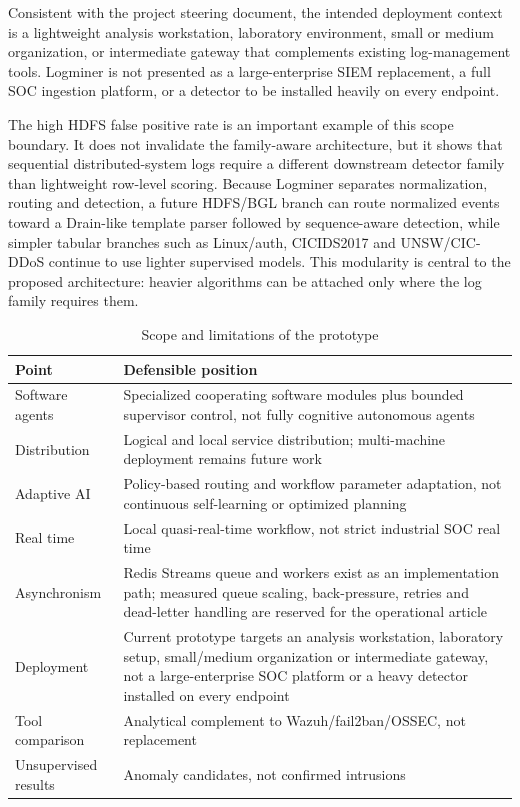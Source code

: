 \documentclass[conference]{IEEEtran}
\newcommand{\logminer}{Logminer}
\begin{document}
Consistent with the project steering document, the intended deployment context is a lightweight analysis workstation, laboratory environment, small or medium organization, or intermediate gateway that complements existing log-management tools. \logminer{} is not presented as a large-enterprise SIEM replacement, a full SOC ingestion platform, or a detector to be installed heavily on every endpoint.

The high HDFS false positive rate is an important example of this scope boundary. It does not invalidate the family-aware architecture, but it shows that sequential distributed-system logs require a different downstream detector family than lightweight row-level scoring. Because \logminer{} separates normalization, routing and detection, a future HDFS/BGL branch can route normalized events toward a Drain-like template parser followed by sequence-aware detection, while simpler tabular branches such as Linux/auth, CICIDS2017 and UNSW/CIC-DDoS continue to use lighter supervised models. This modularity is central to the proposed architecture: heavier algorithms can be attached only where the log family requires them.

\begin{table}[t]
\caption{Scope and limitations of the prototype}
\label{tab:limits}
\centering
\scriptsize
\begin{tabularx}{\linewidth}{p{2.1cm}X}
\toprule
\textbf{Point} & \textbf{Defensible position} \\
\midrule
Software agents & Specialized cooperating software modules plus bounded supervisor control, not fully cognitive autonomous agents \\
Distribution & Logical and local service distribution; multi-machine deployment remains future work \\
Adaptive AI & Policy-based routing and workflow parameter adaptation, not continuous self-learning or optimized planning \\
Real time & Local quasi-real-time workflow, not strict industrial SOC real time \\
Asynchronism & Redis Streams queue and workers exist as an implementation path; measured queue scaling, back-pressure, retries and dead-letter handling are reserved for the operational article \\
Deployment & Current prototype targets an analysis workstation, laboratory setup, small/medium organization or intermediate gateway, not a large-enterprise SOC platform or a heavy detector installed on every endpoint \\
Tool comparison & Analytical complement to Wazuh/fail2ban/OSSEC, not replacement \\
Unsupervised results & Anomaly candidates, not confirmed intrusions \\
\bottomrule
\end{tabularx}
\end{table}
\end{document}
